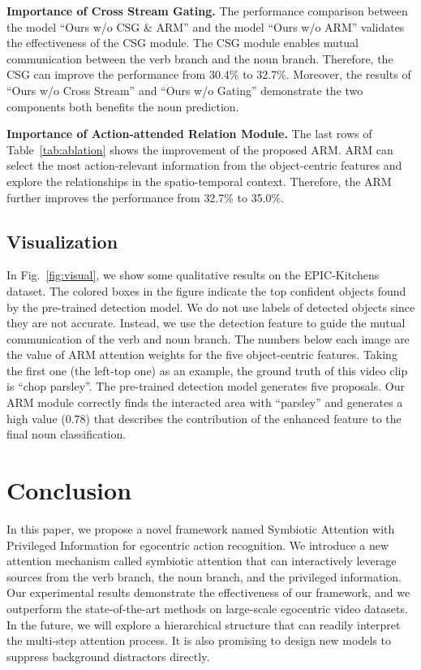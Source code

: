 \documentclass[letterpaper]{article} \usepackage{aaai20}  \usepackage{times}  \usepackage{helvet} \usepackage{courier}  \usepackage[hyphens]{url}  \usepackage{graphicx} \urlstyle{rm} \def\UrlFont{\rm}  \usepackage{graphicx}  \frenchspacing  \setlength{\pdfpagewidth}{8.5in}  \setlength{\pdfpageheight}{11in}  \usepackage{amsfonts,amssymb}
\begin{document}
\textbf{Importance of Cross Stream Gating.}
The performance comparison between the model ``Ours w/o CSG \& ARM'' and the model ``Ours w/o ARM'' validates the effectiveness of the CSG module.
The CSG module enables mutual communication between the verb branch and the noun branch.
Therefore, the CSG can improve the performance from 30.4\% to 32.7\%. Moreover, the results of ``Ours w/o Cross Stream'' and ``Ours w/o Gating'' demonstrate the two components both benefits the noun prediction.

\textbf{Importance of Action-attended Relation Module.}
The last rows of Table~\ref{tab:ablation} shows the improvement of the proposed ARM. 
ARM can select the most action-relevant information from the object-centric features and explore the relationships in the spatio-temporal context. 
Therefore, the ARM further improves the performance from 32.7\% to 35.0\%.


\subsection{Visualization}
In Fig.~\ref{fig:visual}, we show some qualitative results on the EPIC-Kitchens dataset. 
The colored boxes in the figure indicate the top confident objects found by the pre-trained detection model.
We do not use labels of detected objects since they are not accurate. 
Instead, we use the detection feature to guide the mutual communication of the verb and noun branch. 
The numbers below each image are the value of ARM attention weights for the five object-centric features. 
Taking the first one (the left-top one) as an example, the ground truth of this video clip is ``chop parsley''.
The pre-trained detection model generates five proposals.
Our ARM module correctly finds the interacted area with ``parsley'' and generates a high value (0.78) that describes the contribution of the enhanced feature to the final noun classification.

\section{Conclusion}
In this paper, we propose a novel framework named Symbiotic Attention with Privileged Information for egocentric action recognition. We introduce a new attention mechanism called symbiotic attention that can interactively leverage sources from the verb branch, the noun branch, and the privileged information. 
Our experimental results demonstrate the effectiveness of our framework, and we outperform the state-of-the-art methods on large-scale egocentric video datasets. In the future, we will explore a hierarchical structure that can readily interpret the multi-step attention process. It is also promising to design new models to suppress background distractors directly.


\begin{small}


\end{small}
\end{document}
